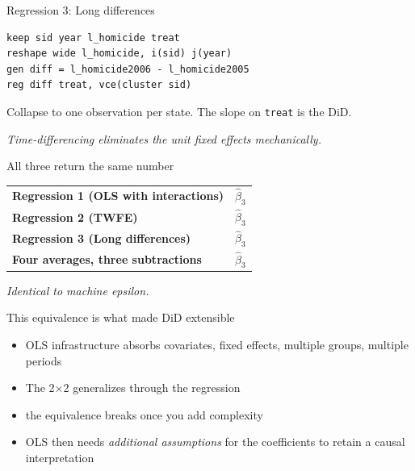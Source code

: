 \documentclass[aspectratio=169,11pt]{beamer}
\begin{document}
\begin{frame}[fragile]{Regression 3: Long differences}
\vspace{0.4em}
\begin{lstlisting}[language={[ANSI]C}]
keep sid year l_homicide treat
reshape wide l_homicide, i(sid) j(year)
gen diff = l_homicide2006 - l_homicide2005
reg diff treat, vce(cluster sid)
\end{lstlisting}
\vspace{0.8em}
Collapse to one observation per state. The slope on \texttt{treat} is the DiD.
\vspace{0.4em}
\begin{center}
\small\color{warmgray}\itshape Time-differencing eliminates the unit fixed effects mechanically.
\end{center}
\end{frame}

\begin{frame}{All three return the same number}
\vspace{1.2em}
\begin{center}
\begin{tabular}{@{}l c@{}}
\textbf{\color{charcoal}Regression 1 (OLS with interactions)} & \color{accent}\textbf{$\widehat{\beta}_3$} \\[0.6em]
\textbf{\color{charcoal}Regression 2 (TWFE)} & \color{accent}\textbf{$\widehat{\beta}_3$} \\[0.6em]
\textbf{\color{charcoal}Regression 3 (Long differences)} & \color{accent}\textbf{$\widehat{\beta}_3$} \\[0.6em]
\textbf{\color{charcoal}Four averages, three subtractions} & \color{accent}\textbf{$\widehat{\beta}_3$} \\
\end{tabular}
\end{center}
\vspace{1em}
\begin{center}
\small\color{warmgray}\itshape Identical to machine epsilon.
\end{center}
\end{frame}

\begin{frame}{This equivalence is what made DiD extensible}
\vspace{0.8em}
\begin{itemize}
  \item OLS infrastructure absorbs covariates, fixed effects, multiple groups, multiple periods
  \item The 2$\times$2 generalizes through the regression
  \item {} the equivalence breaks once you add complexity
  \item OLS then needs \textit{additional assumptions} for the coefficients to retain a causal interpretation
\end{itemize}
\vspace{0.5em}
\end{frame}
\end{document}
